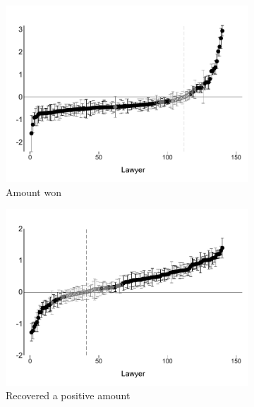 \documentclass[oneside,11pt]{article}
\begin{document}
\begin{figure}[H] 
    \label{heterogeneity}
    \caption{Lawyer quality heterogeneity (objective)}
     \begin{center}
    \begin{subfigure}{0.49\textwidth}
        \caption{Amount won}
        \centering
        \includegraphics[width=\textwidth]{Figuras/betas_ql_liq_total.pdf}
    \end{subfigure}
    \begin{subfigure}{0.49\textwidth}
        \caption{Recovered a positive amount}
        \centering
        \includegraphics[width=\textwidth]{Figuras/betas_ql_pos_rec.pdf}
    \end{subfigure}
    \begin{subfigure}{0.49\textwidth}

\end{subfigure}
\end{center}
\end{figure}
\end{document}
